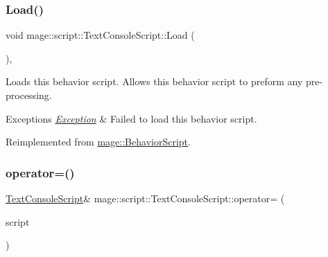 \subsubsection{\texorpdfstring{Load()}{Load()}}
{\footnotesize\ttfamily void mage\+::script\+::\+Text\+Console\+Script\+::\+Load (\begin{DoxyParamCaption}{ }\end{DoxyParamCaption})\hspace{0.3cm}{\ttfamily [override]}, {\ttfamily [virtual]}}

Loads this behavior script. Allows this behavior script to preform any pre-\/processing.


\begin{DoxyExceptions}{Exceptions}
{\em \hyperlink{classmage_1_1_exception}{Exception}} & Failed to load this behavior script. \\
\hline
\end{DoxyExceptions}


Reimplemented from \hyperlink{classmage_1_1_behavior_script_a06521eef472f2d878a9f652b95b723a8}{mage\+::\+Behavior\+Script}.

\hypertarget{classmage_1_1script_1_1_text_console_script_a68af2a144f641c9813b333544fe3562a}{}\label{classmage_1_1script_1_1_text_console_script_a68af2a144f641c9813b333544fe3562a} 
\subsubsection{\texorpdfstring{operator=()}{operator=()}\hspace{0.1cm}{\footnotesize\ttfamily [1/2]}}
{\footnotesize\ttfamily \hyperlink{classmage_1_1script_1_1_text_console_script}{Text\+Console\+Script}\& mage\+::script\+::\+Text\+Console\+Script\+::operator= (\begin{DoxyParamCaption}\item[{const \hyperlink{classmage_1_1script_1_1_text_console_script}{Text\+Console\+Script} \&}]{script }\end{DoxyParamCaption})\hspace{0.3cm}{\ttfamily [delete]}}

\hypertarget{classmage_1_1script_1_1_text_console_script_ae8560dece8d507ee338dda68e3176fed}{}\label{classmage_1_1script_1_1_text_console_script_ae8560dece8d507ee338dda68e3176fed} 
